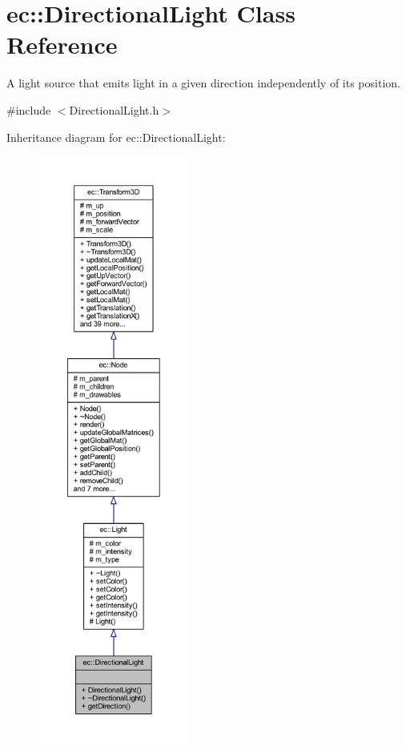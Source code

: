 \hypertarget{classec_1_1_directional_light}{}\section{ec\+:\+:Directional\+Light Class Reference}
\label{classec_1_1_directional_light}


A light source that emits light in a given direction independently of its position.  




{\ttfamily \#include $<$Directional\+Light.\+h$>$}



Inheritance diagram for ec\+:\+:Directional\+Light\+:\nopagebreak
\begin{figure}[H]
\begin{center}
\leavevmode
\includegraphics[height=550pt]{classec_1_1_directional_light__inherit__graph}
\end{center}
\end{figure}


